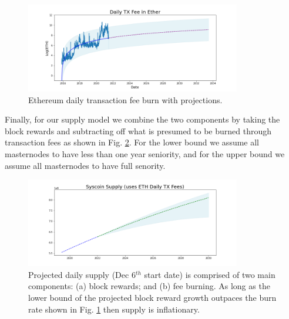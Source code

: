 \documentclass[peerreview]{ieeesyscoin}
\begin{document}
\begin{figure}[h!]
\includegraphics[width=3.7in]{img/eth_daily_tx_fee.png}
\caption{Ethereum daily transaction fee burn with projections.} 
\label{fig:tx_burn}
\end{figure} 

Finally, for our supply model we combine the two components by taking the block rewards and subtracting off what is presumed to be burned through transaction fees as shown in Fig. \ref{fig:tx_delay}. For the lower bound we assume all masternodes to have less than one year seniority, and for the upper bound   we assume all masternodes to have full senority.

\begin{figure}[h!]
\includegraphics[width=3.7in]{img/syscoin_daily_supply.png}
\caption{Projected daily supply (Dec 6$^{th}$ start date) is comprised of two main components: (a) block rewards; and (b) fee burning. As long as the lower bound of the projected block reward growth outpaces the burn rate shown in Fig. \ref{fig:tx_burn} then supply is inflationary.} 
\label{fig:tx_delay}
\end{figure} 
\end{document}
